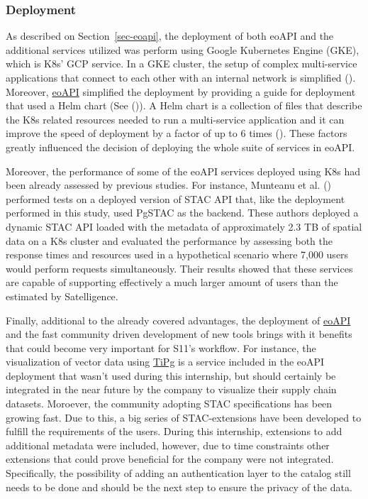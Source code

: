 \documentclass[
  oneside,
  open=any]{scrbook}
\begin{document}
\subsubsection*{Deployment}\label{deployment}

As described on Section~\ref{sec-eoapi}, the deployment of both eoAPI
and the additional services utilized was perform using Google Kubernetes
Engine (GKE), which is K8s' GCP service. In a GKE cluster, the setup of
complex multi-service applications that connect to each other with an
internal network is simplified
(). Moreover,
\href{www.eoapi.dev}{eoAPI} simplified the deployment by providing a
guide for deployment that used a Helm chart (See
()). A Helm chart is a collection of files that describe the K8s
related resources needed to run a multi-service application and it can
improve the speed of deployment by a factor of up to 6 times
(). These
factors greatly influenced the decision of deploying the whole suite of
services in eoAPI.

Moreover, the performance of some of the eoAPI services deployed using
K8s had been already assessed by previous studies. For instance,
Munteanu et al. ()
performed tests on a deployed version of STAC API that, like the
deployment performed in this study, used PgSTAC as the backend. These
authors deployed a dynamic STAC API loaded with the metadata of
approximately 2.3 TB of spatial data on a K8s cluster and evaluated the
performance by assessing both the response times and resources used in a
hypothetical scenario where 7,000 users would perform requests
simultaneously. Their results showed that these services are capable of
supporting effectively a much larger amount of users than the estimated
by Satelligence.

Finally, additional to the already covered advantages, the deployment of
\href{www.eoapi.dev}{eoAPI} and the fast community driven development of
new tools brings with it benefits that could become very important for
S11's workflow. For instance, the visualization of vector data using
\href{https://github.com/developmentseed/tipg}{TiPg} is a service
included in the eoAPI deployment that wasn't used during this
internship, but should certainly be integrated in the near future by the
company to visualize their supply chain datasets. Moroever, the
community adopting STAC specifications has been growing fast. Due to
this, a big series of STAC-extensions have been developed to fulfill the
requirements of the users. During this internship, extensions to add
additional metadata were included, however, due to time constraints
other extensions that could prove beneficial for the company were not
integrated. Specifically, the possibility of adding an authentication
layer to the catalog still needs to be done and should be the next step
to ensure the privacy of the data.
\end{document}
